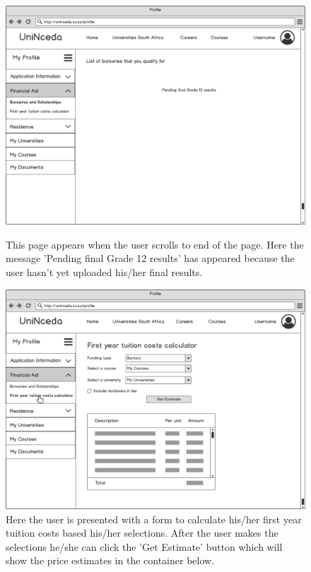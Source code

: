 \documentclass[a4paper, 12pt]{article}
\begin{document}
\setcounter{figure}{1}

\begin{figure}[H]
\centering

\includegraphics[scale=0.4]{ProfileFinancialAidBursariesPage2NoResults}
\caption{This page appears when the user scrolls to end of the page. Here the message 'Pending final Grade 12 results' has appeared because the user hasn't yet uploaded his/her final results.}
\label{ProfileFinancialAidBursariesPage2NoResults}

\vspace{1cm}

\renewcommand{\figurename}{Figure}
\setcounter{figure}{0}

\includegraphics[scale=0.4]{ProfileFinancialAidFeesEstimator}
\caption{Here the user is presented with a form to calculate his/her first year tuition costs based his/her selections. After the user makes the selections he/she can click the 'Get Estimate' button which will show the price estimates in the container below.}
\label{ProfileFinancialAidFeesEstimator}

\end{figure}
\end{document}
